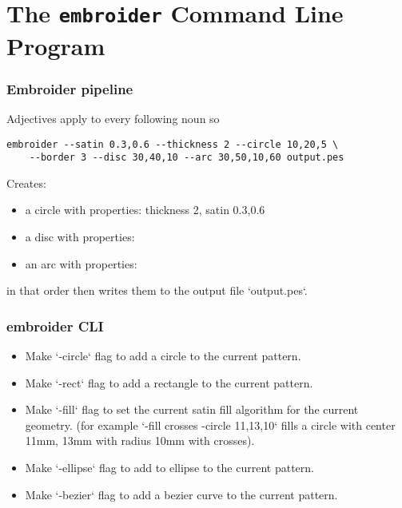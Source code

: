 \chapter{The \texttt{embroider} Command Line Program}


\subsection{Embroider pipeline}

Adjectives apply to every following noun so

\begin{lstlisting}
embroider --satin 0.3,0.6 --thickness 2 --circle 10,20,5 \
    --border 3 --disc 30,40,10 --arc 30,50,10,60 output.pes
\end{lstlisting}

Creates:

\begin{itemize}
\item a circle with properties: thickness 2, satin 0.3,0.6
\item a disc with properties: 
\item an arc with properties:
\end{itemize}

in that order then writes them to the output file `output.pes`.

\subsection{embroider CLI}

\begin{itemize}
\item Make `-circle` flag to add a circle to the current pattern.
\item Make `-rect` flag to add a rectangle to the current pattern.
\item Make `-fill` flag to set the current satin fill algorithm for the current geometry. (for example `-fill crosses -circle 11,13,10` fills a circle with center 11mm, 13mm with radius 10mm with crosses).
\item Make `-ellipse` flag to add to ellipse to the current pattern.
\item Make `-bezier` flag to add a bezier curve to the current pattern.
\end{itemize}
